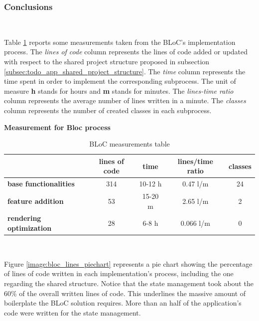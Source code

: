 \subsubsection{Conclusions} \mbox{} \\
\label{subpar:render_optimizations_bloc}

Table \ref{table:recap_bloc} reports some measurements taken from the BLoC's implementation process. The \textit{lines of code} column represents the lines of code added or updated with respect to the shared project structure proposed in subsection \ref{subsec:todo_app_shared_project_structure}. The \textit{time }column represents the time spent in order to implement the corresponding subprocess. The unit of measure \textbf{h} stands for hours and \textbf{m} stands for minutes. The \textit{lines-time ratio} column represents the average number of lines written in a minute. The \textit{classes} column represents the number of created classes in each subprocess.

\begin{table}[H]
    \caption*{\textbf{Measurement for Bloc process}}
    \centering 
    \begin{tabular}{| l | c | c | c | c |}
    \hline
    \rowcolor{bluepoli!40} %
    \hline
     & \textbf{lines of code} & \textbf{time} & \textbf{lines/time ratio} & \textbf{classes} \T\B \\
    \hline
    \textbf{base functionalities} & 314 & 10-12 h & 0.47 l/m & 24 \T\B \\ 
    \textbf{feature addition} & 53 & 15-20 m & 2.65 l/m & 2 \T\B\\ 
    \textbf{rendering optimization} & 28 & 6-8 h & 0.066 l/m & 0
    \T\B\\
    \hline
    \end{tabular}
    \\[10pt]
    \caption{BLoC measurements table}
    \label{table:recap_bloc}
\end{table}

Figure \ref{image:bloc_lines_piechart} represents a pie chart showing the percentage of lines of code written in each implementation's process, including the one regarding the shared structure. Notice that the state management took about the 60\% of the overall written lines of code. This underlines the massive amount of boilerplate the BLoC solution requires. More than an half of the application's code were written for the state management.

